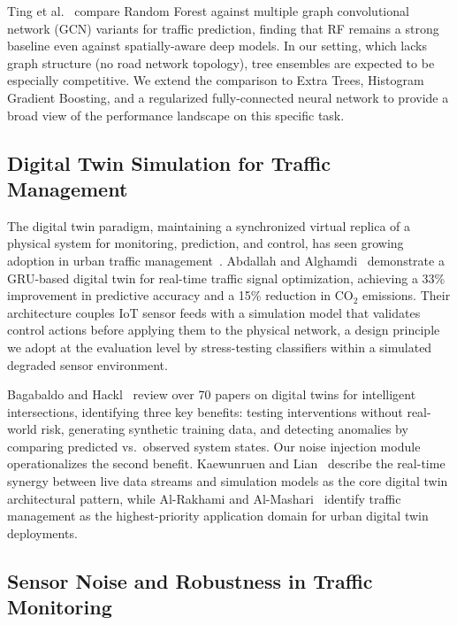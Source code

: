 \documentclass[conference,onecolumn,12pt]{IEEEtran}
\begin{document}
Ting et al.~\cite{ting2021} compare Random Forest against multiple graph
convolutional network (GCN) variants for traffic prediction, finding that RF
remains a strong baseline even against spatially-aware deep models. In our
setting, which lacks graph structure (no road network topology), tree
ensembles are expected to be especially competitive. We extend the comparison
to Extra Trees, Histogram Gradient Boosting, and a regularized
fully-connected neural network to provide a broad view of the performance
landscape on this specific task.

\subsection{Digital Twin Simulation for Traffic Management}

The digital twin paradigm, maintaining a synchronized virtual replica of a
physical system for monitoring, prediction, and control, has seen growing
adoption in urban traffic
management~\cite{abdallah2026,bagabaldo2025,kaewunruen2022,alrakhami2025}.
Abdallah and Alghamdi~\cite{abdallah2026} demonstrate a GRU-based digital
twin for real-time traffic signal optimization, achieving a 33\% improvement
in predictive accuracy and a 15\% reduction in CO$_2$ emissions. Their
architecture couples IoT sensor feeds with a simulation model that validates
control actions before applying them to the physical network, a design
principle we adopt at the evaluation level by stress-testing classifiers
within a simulated degraded sensor environment.

Bagabaldo and Hackl~\cite{bagabaldo2025} review over 70 papers on digital
twins for intelligent intersections, identifying three key benefits: testing
interventions without real-world risk, generating synthetic training data, and
detecting anomalies by comparing predicted vs.\ observed system states. Our
noise injection module operationalizes the second benefit. Kaewunruen and
Lian~\cite{kaewunruen2022} describe the real-time synergy between live data
streams and simulation models as the core digital twin architectural pattern,
while Al-Rakhami and Al-Mashari~\cite{alrakhami2025} identify traffic
management as the highest-priority application domain for urban digital twin
deployments.

\subsection{Sensor Noise and Robustness in Traffic Monitoring}
\end{document}
